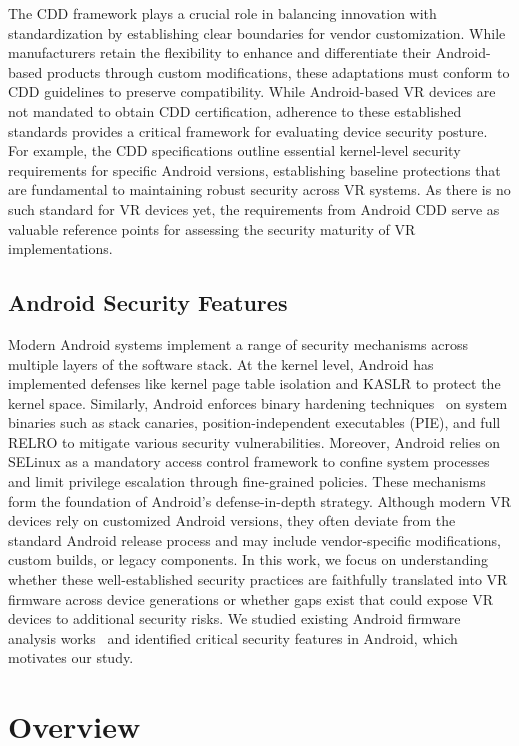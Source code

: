 \documentclass[sigconf]{acmart}
\begin{document}
The CDD framework plays a crucial role in balancing innovation with standardization by establishing clear boundaries for vendor customization. While manufacturers retain the flexibility to enhance and differentiate their Android-based products through custom modifications, these adaptations must conform to CDD guidelines to preserve compatibility. 
While Android-based VR devices are not mandated to obtain CDD certification, adherence to these established standards provides a critical framework for evaluating device security posture. For example, the CDD specifications outline essential kernel-level security requirements for specific Android versions, establishing baseline protections that are fundamental to maintaining robust security across VR systems. As there is no such standard for VR devices yet, the requirements from Android CDD serve as valuable reference points for assessing the security maturity of VR implementations.

\subsection{Android Security Features}
Modern Android systems implement a range of security mechanisms across multiple layers of the software stack.
At the kernel level, Android has implemented defenses like kernel page table isolation and KASLR to protect the kernel space. 
Similarly, Android enforces binary hardening techniques~\cite{yut,possemato2021trust} on system binaries such as stack canaries, position-independent executables (PIE), and full RELRO to mitigate various security vulnerabilities.
Moreover, Android relies on SELinux as a mandatory access control framework to confine system processes and limit privilege escalation through fine-grained policies.
These mechanisms form the foundation of Android's defense-in-depth strategy.
Although modern VR devices rely on customized Android versions, they often deviate from the standard Android release process and may include vendor-specific modifications, custom builds, or legacy components.
In this work, we focus on understanding whether these well-established security practices are faithfully translated into VR firmware across device generations or whether gaps exist that could expose VR devices to additional security risks.
We studied existing Android firmware analysis works~\cite{maar2024defects,hernandez2020bigmac,possemato2021trust,gamba2020analysis,hou2022large,hou2023can,sutter2023firmwaredroid,elsabagh2020firmscope,elgharabawy2022sausage,el2021dissecting} and identified critical security features in Android, which motivates our study.  \section{Overview}
\label{sec:overview}
\end{document}
